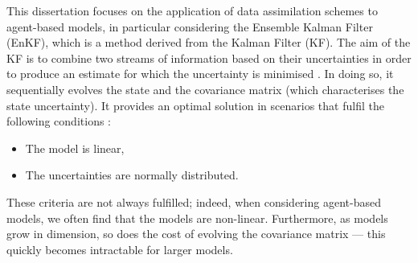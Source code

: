 \documentclass[12pt, twoside, a4paper]{article}
\begin{document}

This dissertation focuses on the application of data assimilation schemes to
agent-based models, in particular considering the Ensemble Kalman Filter (EnKF),
which is a method derived from the Kalman Filter (KF).
The aim of the KF is to combine two streams of information based on their
uncertainties in order to produce an estimate for which the uncertainty is
minimised \citep{kalman1960new}.
In doing so, it sequentially evolves the state and the covariance matrix (which
characterises the state uncertainty).
It provides an optimal solution in scenarios that fulfil the following
conditions \citep{mandel2009brief}:
\begin{itemize}
    \item The model is linear,
    \item The uncertainties are normally distributed.
\end{itemize}

These criteria are not always fulfilled; indeed, when considering agent-based
models, we often find that the models are non-linear.
Furthermore, as models grow in dimension, so does the cost of evolving the
covariance matrix --- this quickly becomes intractable for larger models.
\end{document}
